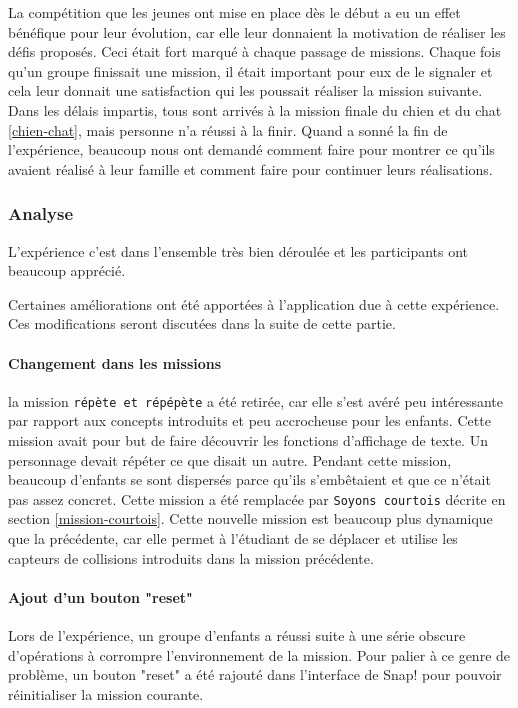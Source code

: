 La compétition que les jeunes ont mise en place dès le début a eu un effet bénéfique pour leur évolution, car elle leur donnaient la motivation de réaliser les défis proposés. Ceci était fort marqué à chaque passage de missions. Chaque fois qu'un groupe finissait une mission, il était important pour eux de le signaler et cela leur donnait une satisfaction qui les poussait réaliser la mission suivante.\\ %

Dans les délais impartis, tous sont arrivés à la mission finale du chien et du chat \ref{chien-chat}, mais personne n'a réussi à la finir. Quand a sonné la fin de l'expérience, beaucoup nous ont demandé comment faire pour montrer ce qu'ils avaient réalisé à leur famille et comment faire pour continuer leurs réalisations.

\subsubsection{Analyse}
\label{analyse-kidscode}
L'expérience c'est dans l'ensemble très bien déroulée et les participants ont beaucoup apprécié.

Certaines améliorations ont été apportées à l'application due à cette expérience. Ces modifications seront discutées dans la suite de cette partie.

\paragraph{Changement dans les missions}
la mission \texttt{répète et répépète} a été retirée, car elle s'est avéré peu intéressante par rapport aux concepts introduits et peu accrocheuse pour les enfants. Cette mission avait pour but de faire découvrir les fonctions d'affichage de texte. Un personnage devait répéter ce que disait un autre. Pendant cette mission, beaucoup d'enfants se sont dispersés parce qu'ils s'embêtaient et que ce n'était pas assez concret. Cette mission a été remplacée par \texttt{Soyons courtois} décrite en section \ref{mission-courtois}. Cette nouvelle mission est beaucoup plus dynamique que la précédente, car elle permet à l'étudiant de se déplacer et utilise les capteurs de collisions introduits dans la mission précédente.

\paragraph{Ajout d'un bouton "reset"}
Lors de l'expérience, un groupe d'enfants a réussi suite à une série obscure d'opérations à corrompre l'environnement de la mission. Pour palier à ce genre de problème, un bouton "reset" a été rajouté dans l'interface de Snap! pour pouvoir réinitialiser la mission courante.

